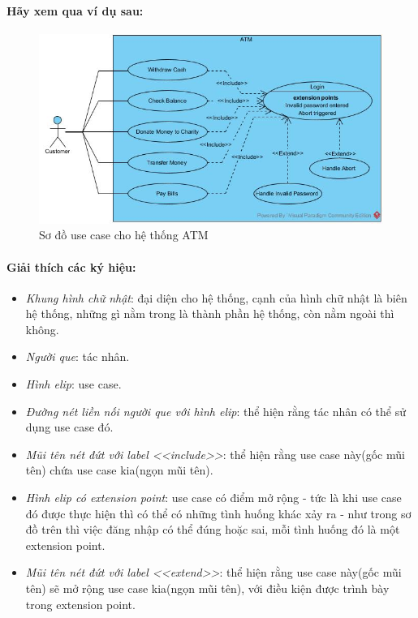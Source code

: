 \documentclass{article}
\begin{document}
  \paragraph{\textnormal{
    Hãy xem qua ví dụ sau:
  }}

  \begin{figure}[!ht]
    \centering
    \includegraphics[scale=0.6]{../pictures/diagrams/usecase/usecase-diagram-example.jpg}
    \caption{Sơ đồ use case cho hệ thống ATM}
  \end{figure}

  \paragraph{\textnormal{Giải thích các ký hiệu:}}
  \begin{itemize}
    \item \textit{Khung hình chữ nhật}: đại diện cho hệ thống, cạnh của hình chữ nhật là biên hệ thống, những gì nằm trong là thành phần hệ thống, còn nằm ngoài thì không.
    \item \textit{Người que}: tác nhân.
    \item \textit{Hình elip}: use case.
    \item \textit{Đường nét liền nối người que với hình elip}: thể hiện rằng tác nhân có thể sử dụng use case đó.
    \item \textit{Mũi tên nét đứt với label <<include>>}: thể  hiện rằng use case này(gốc mũi tên) chứa use case kia(ngọn mũi tên).
    \item \textit{Hình elip có extension point}: use case có điểm mở rộng - tức là khi use case đó được thực hiện thì có thể có những tình huống khác xảy ra - như trong sơ đồ trên thì việc đăng nhập có thể đúng hoặc sai, mỗi tình huống đó là một extension point.
    \item \textit{Mũi tên nét đứt với label <<extend>>}: thể hiện rằng use case này(gốc mũi tên) sẽ mở rộng use case kia(ngọn mũi tên), với điều kiện được trình bày trong extension point.
  \end{itemize}
\end{document}
